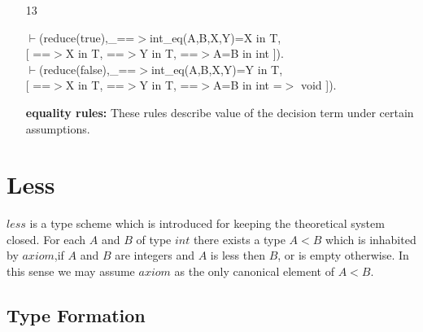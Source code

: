 \documentclass[11pt]{report}
\newcommand{\inv}[1]{\index{#1}}
\begin{document}
\begin{enumerate}
 {\bf membership rule:}
 The decision operator yields a value of the type $T$, provided
 both the \emph{then} and the \emph{else} part of the decision
 operator are elements of $T$.
 
 \item[13]
\begin{sf}\begin{tabbing}
$\vdash$(reduce(true),\_\hspace{0.1em}==$>$int\_\hspace{0.1em}eq(A,B,X,Y)=X in T, \\[-0.15ex]
\hspace{2em}[  ==$>$X in T, ==$>$Y in T,  ==$>$A=B in int ]).\\[-0.15ex]
$\vdash$(reduce(false),\_\hspace{0.1em}==$>$int\_\hspace{0.1em}eq(A,B,X,Y)=Y in T, \\[-0.15ex]
\hspace{2em}[  ==$>$X in T, ==$>$Y in T, ==$>$A=B in int =$>$ void ]).
\end{tabbing}\end{sf}

 {\bf equality rules:}      
 These rules describe value of the decision term under certain
 assumptions. 
  
 \end{enumerate}
 \section{Less}
 \inv{less type scheme}
 $less$ is a type scheme which is introduced for keeping the
 theoretical system closed. For each $A$ and $B$ of type
 $int$ there exists a type $A$$<$$B$ which is inhabited 
 by $axiom$,if $A$ and $B$ are integers and $A$ is less then $B$,
 or is empty otherwise. In this sense
 we may assume $axiom$ as the only canonical element of $A$$<$$B$.
  
 \subsection{Type Formation}
  
\end{document}
